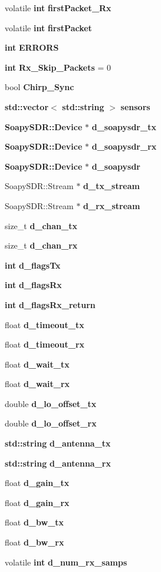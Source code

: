 \begin{DoxyCompactItemize}
\item 
volatile {\bf int} {\bf first\+Packet\+\_\+\+Rx}
\item 
volatile {\bf int} {\bf first\+Packet}
\item 
{\bf int} {\bf E\+R\+R\+O\+RS}
\item 
{\bf int} {\bf Rx\+\_\+\+Skip\+\_\+\+Packets} = 0
\item 
bool {\bf Chirp\+\_\+\+Sync}
\item 
{\bf std\+::vector}$<$ {\bf std\+::string} $>$ {\bf sensors}
\item 
{\bf Soapy\+S\+D\+R\+::\+Device} $\ast$ {\bf d\+\_\+soapysdr\+\_\+tx}
\item 
{\bf Soapy\+S\+D\+R\+::\+Device} $\ast$ {\bf d\+\_\+soapysdr\+\_\+rx}
\item 
{\bf Soapy\+S\+D\+R\+::\+Device} $\ast$ {\bf d\+\_\+soapysdr}
\item 
Soapy\+S\+D\+R\+::\+Stream $\ast$ {\bf d\+\_\+tx\+\_\+stream}
\item 
Soapy\+S\+D\+R\+::\+Stream $\ast$ {\bf d\+\_\+rx\+\_\+stream}
\item 
size\+\_\+t {\bf d\+\_\+chan\+\_\+tx}
\item 
size\+\_\+t {\bf d\+\_\+chan\+\_\+rx}
\item 
{\bf int} {\bf d\+\_\+flags\+Tx}
\item 
{\bf int} {\bf d\+\_\+flags\+Rx}
\item 
{\bf int} {\bf d\+\_\+flags\+Rx\+\_\+return}
\item 
float {\bf d\+\_\+timeout\+\_\+tx}
\item 
float {\bf d\+\_\+timeout\+\_\+rx}
\item 
float {\bf d\+\_\+wait\+\_\+tx}
\item 
float {\bf d\+\_\+wait\+\_\+rx}
\item 
double {\bf d\+\_\+lo\+\_\+offset\+\_\+tx}
\item 
double {\bf d\+\_\+lo\+\_\+offset\+\_\+rx}
\item 
{\bf std\+::string} {\bf d\+\_\+antenna\+\_\+tx}
\item 
{\bf std\+::string} {\bf d\+\_\+antenna\+\_\+rx}
\item 
float {\bf d\+\_\+gain\+\_\+tx}
\item 
float {\bf d\+\_\+gain\+\_\+rx}
\item 
float {\bf d\+\_\+bw\+\_\+tx}
\item 
float {\bf d\+\_\+bw\+\_\+rx}
\item 
volatile {\bf int} {\bf d\+\_\+num\+\_\+rx\+\_\+samps}

\end{DoxyCompactItemize}
